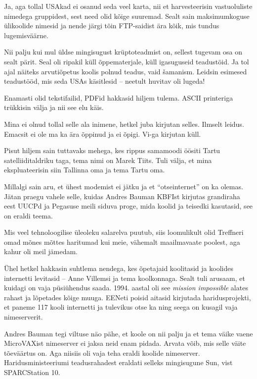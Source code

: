 Ja, aga tollal USAkad ei osanud seda veel karta, nii et 
harvesteerisin vastuoluliste nimedega gruppidest, sest need olid kõige 
suuremad. Sealt sain maksimumkoguse ülikoolide nimesid ja nende järgi tõin FTP-saidist ära kõik, mis tundus lugemisväärne.


Nii palju kui mul üldse mingisugust krüptoteadmist on, sellest tugevam 
osa on sealt pärit. Seal oli ripakil küll õppematerjale, küll 
igasuguseid teadustöid. Ja tol ajal näiteks arvutiõpetus koolis polnud 
teadus, vaid šamanism. Leidsin esimesed teadustööd, mis 
seda USAs käsitlesid -- neetult huvitav oli lugeda! 


Enamasti olid tekstifailid, PDFid hakkasid hiljem tulema. 
ASCII printeriga trükkisin välja ja nii see elu käis. 


Mina ei olnud tollal selle ala inimene, hetkel juba kirjutan selles. Ilmselt leidus. 
Emacsit ei ole ma ka ära õppinud ja ei õpigi. Vi-ga kirjutan küll. 

Pisut hiljem sain tuttavaks mehega, kes rippus samamoodi öösiti Tartu 
satelliiditaldriku taga, tema nimi on Marek Tiits. 
Tuli välja, et mina ekspluateerisin siin Tallinna oma ja tema Tartu oma. 

Millalgi sain aru, et ühest 
modemist ei jätku ja et \enquote{otseinternet} on ka olemas. 
Jätan praegu vahele selle, kuidas Andres Bauman 
KBFIst kirjutas grandiraha eest UUCPd ja Pegasuse meili siduva 
proge, mida koolid ja teisedki kasutasid, see on eraldi teema. 

Mis veel tehnoloogilise üleoleku salarelva puutub, siis 
loomulikult olid Treffneri omad mõnes mõttes haritumad kui 
meie, vähemalt maailmavaate poolest, aga kahur oli meil jämedam. 

Ühel hetkel hakkasin suhtlema nendega, kes õpetajaid 
koolitasid ja koolides internetti levitasid -- Anne Villemsi ja tema koolkonnaga. Sealt tuli arusaam, et kuidagi on vaja 
püsiühendus saada. 1994. aastal oli see \emph{mission impossible} alates 
rahast ja lõpetades kõige muuga. EENeti poisid aitasid kirjutada 
haridusprojekti, et paneme 117 kooli internetti ja tulevikus otse ka ning seega on kusagil vaja nimeserverit. 

Andres Bauman tegi viltuse näo pähe, et koole on nii palju 
ja et tema väike vaene MicroVAXist nimeserver ei jaksa neid enam pidada. 
Arvata võib, mis selle väite tõeväärtus on. Aga niisiis oli vaja teha eraldi koolide nimeserver. Haridusministeeriumi teadusrahadest eraldati selleks
mingisugune Sun, vist SPARCStation 10. 

